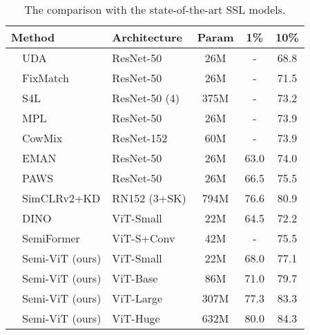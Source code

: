 \documentclass{article}
\begin{document}
\setlength{\tabcolsep}{10pt}
\begin{table}[t]
\begin{center}
\small
\begin{tabular}{lllccc}
\toprule
\multicolumn{2}{l}{Method} &Architecture &Param & 1\% & 10\% \\\hline
\parbox[t]{2mm}{} &UDA \cite{DBLP:conf/nips/XieDHL020} &ResNet-50 &26M &- &68.8 \\
&FixMatch \cite{DBLP:conf/nips/SohnBCZZRCKL20} &ResNet-50 &26M &- &71.5 \\
&S4L \cite{DBLP:conf/iccv/BeyerZOK19} &ResNet-50 (4) &375M &- &73.2 \\
&MPL \cite{DBLP:conf/cvpr/PhamDXL21} &ResNet-50 &26M &- &73.9 \\
&CowMix \cite{DBLP:conf/visapp/FrenchOS22} &ResNet-152 &60M &- &73.9 \\
&EMAN \cite{DBLP:conf/cvpr/CaiRMFTS21} &ResNet-50 &26M &63.0 &74.0 \\
&PAWS \cite{DBLP:conf/iccv/AssranCMBJBR21} &ResNet-50 &26M &66.5 &75.5 \\
&SimCLRv2+KD \cite{DBLP:conf/nips/ChenKSNH20} &RN152 (3+SK) &794M &76.6 &80.9 \\\hline
\parbox[t]{2mm}{} &DINO \cite{DBLP:conf/iccv/CaronTMJMBJ21} &ViT-Small &22M &64.5 &72.2 \\
&SemiFormer \cite{weng2021semi} &ViT-S+Conv &42M &- &75.5 \\
&Semi-ViT (ours) &ViT-Small &22M &68.0 &77.1 \\
&Semi-ViT (ours) &ViT-Base &86M &71.0 &79.7 \\
&Semi-ViT (ours) &ViT-Large &307M &77.3 &83.3 \\
&Semi-ViT (ours) &ViT-Huge &632M &80.0 &84.3 \\
\bottomrule
\end{tabular}
\caption{The comparison with the state-of-the-art SSL models.}
\label{tab:sota}
\end{center}\vspace{-3mm}
\end{table}
\end{document}
